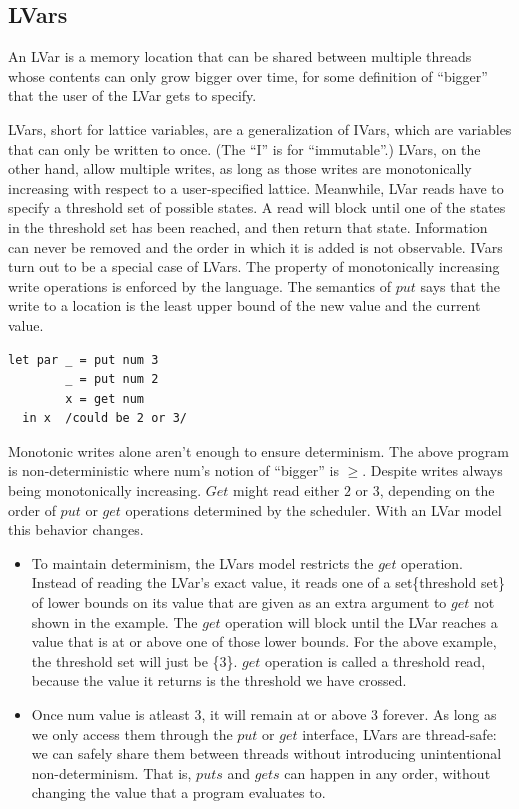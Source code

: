 \documentclass[twocolumn]{article}
\begin{document}
\subsection{LVars}
An LVar is a memory location that can be shared between multiple threads whose contents can only grow bigger over time, for some definition of “bigger” that the user of the LVar gets to specify. \par
LVars, short for lattice variables, are a generalization of IVars, which are variables that can only be written to once. (The “I” is for “immutable”.) LVars, on the other hand, allow multiple writes, as long as those writes are monotonically increasing with respect to a user-specified lattice. Meanwhile, LVar reads have to specify a threshold set of possible states. A read will block until one of the states in the threshold set has been reached, and then return that state. Information can never be removed and the order in which it is added is not observable. IVars turn out to be a special case of LVars. 
The property of monotonically increasing write operations is enforced by the language. The semantics of $put$ says that the write to a location is the least upper bound of the new value and the current value. 
\begin{verbatim}
let par _ = put num 3
        _ = put num 2
        x = get num
  in x  /could be 2 or 3/
\end{verbatim}
Monotonic writes alone aren't enough to ensure determinism. The above program is non-deterministic where num's notion of “bigger” is $\geq$. Despite writes always being monotonically increasing. $Get$ might read either $2$ or $3$, depending on the order of $put$ or $get$ operations determined by the scheduler. With an LVar model this behavior changes.\par
\begin{itemize}
\item To maintain determinism, the LVars model restricts the $get$ operation. Instead of reading the LVar’s exact value, it reads one of a set\{threshold set\} of lower bounds on its value that are given as an extra argument to $get$ not shown in the example. The $get$ operation will block until the LVar reaches a value that is at or above one of those lower bounds. For the above example, the threshold set will just be \{$3$\}. $get$ operation is called a threshold read, because the value it returns is the threshold we have crossed.
\item Once num value is atleast $3$, it will remain at or above $3$ forever. As long as we only access them through the $put$ or $get$ interface, LVars are thread-safe: we can safely share them between threads without introducing unintentional non-determinism. That is, $puts$ and $gets$ can happen in any order, without changing the value that a program evaluates to.
\end{itemize}
\end{document}
